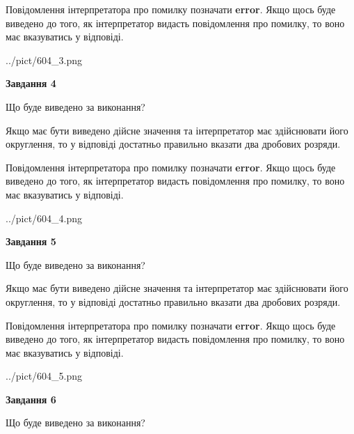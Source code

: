 \documentclass[12pt, ukrainian]{article}
\begin{document}
{\begin {Large}
Повідомлення інтерпретатора про помилку позначати \textbf{error}.
Якщо щось буде виведено до того, як інтерпретатор видасть повідомлення про помилку, 
то воно має вказуватись у відповіді. \par

\begin{center}
	{../pict/604_3.png}
\end{center}
\newpage

{\begin {center}\textbf{Завдання 4}\end {center}}\par
Що буде виведено за виконання? \par

Якщо має бути виведено дійсне значення та інтерпретатор має здійснювати його округлення, 
то у відповіді достатньо правильно вказати два дробових розряди.

Повідомлення інтерпретатора про помилку позначати \textbf{error}.
Якщо щось буде виведено до того, як інтерпретатор видасть повідомлення про помилку, 
то воно має вказуватись у відповіді. \par

\begin{center}
	{../pict/604_4.png}
\end{center}
\newpage

{\begin {center}\textbf{Завдання 5}\end {center}}\par
Що буде виведено за виконання? \par

Якщо має бути виведено дійсне значення та інтерпретатор має здійснювати його округлення, 
то у відповіді достатньо правильно вказати два дробових розряди.

Повідомлення інтерпретатора про помилку позначати \textbf{error}.
Якщо щось буде виведено до того, як інтерпретатор видасть повідомлення про помилку, 
то воно має вказуватись у відповіді. \par

\begin{center}
	{../pict/604_5.png}
\end{center}
\newpage

{\begin {center}\textbf{Завдання 6}\end {center}}\par
Що буде виведено за виконання? \par


\end{Large}}
\end{document}
